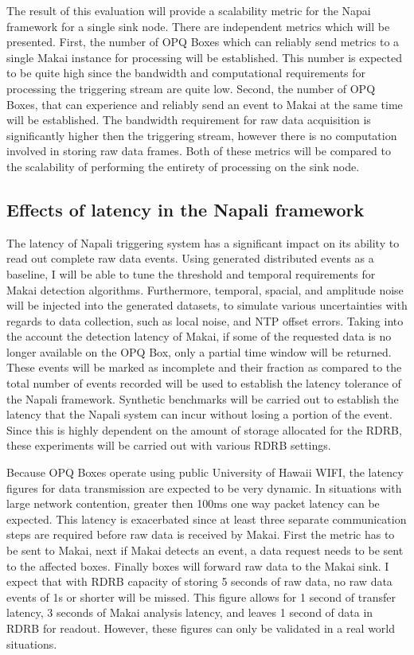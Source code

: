 The result of this evaluation will provide a scalability metric for the Napai framework for a single sink node.
There are independent metrics which will be presented.
First, the number of OPQ Boxes which can reliably send metrics to a single Makai instance for processing will be established.
This number is expected to be quite high since the bandwidth and computational requirements for processing the triggering stream are quite low.
Second, the number of OPQ Boxes, that can experience and reliably send an event to Makai at the same time will be established.
The bandwidth requirement for raw data acquisition is significantly higher then the triggering stream, however there is no computation involved in storing raw data frames.
Both of these metrics will be compared to the scalability of performing the entirety of processing on the sink node.

\subsection{Effects of latency in the Napali framework} \label{iexp:sec:lat}
The latency of Napali triggering system has a significant impact on its ability to read out complete raw data events.
Using generated distributed events as a baseline, I will be able to tune the threshold and temporal requirements for Makai detection algorithms.
Furthermore, temporal, spacial, and amplitude noise will be injected into the generated datasets, to simulate various uncertainties with regards to data collection, such as local noise, and NTP offset errors.
Taking into the account the detection latency of Makai, if some of the requested data is no longer available on the OPQ Box, only a partial time window will be returned.
These events will be marked as incomplete and their fraction as compared to the total number of events recorded will be used to establish the latency tolerance of the Napali framework.
Synthetic benchmarks will be carried out to establish the latency that the Napali system can incur without losing a portion of the event.
Since this is highly dependent on the amount of storage allocated for the RDRB, these experiments will be carried out with various RDRB settings.

Because OPQ Boxes operate using public University of Hawaii WIFI, the latency figures for data transmission are expected to be very dynamic.
In situations with large network contention, greater then 100ms one way packet latency can be expected.
This latency is exacerbated since at least three separate communication steps are required before raw data is received by Makai.
First the metric has to be sent to Makai, next if Makai detects an event, a data request needs to be sent to the affected boxes.
Finally boxes will forward raw data to the Makai sink.
I expect that with RDRB capacity of storing 5 seconds of raw data, no raw data events of 1s or shorter will be missed.
This figure allows for 1 second of transfer latency, 3 seconds of Makai analysis latency, and leaves 1 second of data in RDRB for readout.
However, these figures can only be validated in a real world situations.

